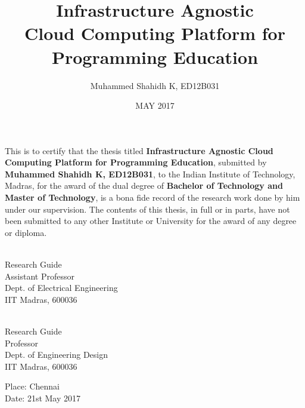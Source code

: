\documentclass[DD]{iitmdiss}
\begin{document}

\title{Infrastructure Agnostic\\
	 Cloud Computing Platform for Programming Education}

\author{Muhammed Shahidh K, ED12B031}

\date{MAY 2017}

\maketitle

\certificate

\vspace*{0.5in}

\noindent This is to certify that the thesis titled {\bf Infrastructure Agnostic Cloud Computing Platform for Programming Education}, submitted by {\bf Muhammed Shahidh K, ED12B031}, 
  to the Indian Institute of Technology, Madras, for
the award of the dual degree of {\bf Bachelor of Technology and Master of Technology}, is a bona fide
record of the research work done by him under our supervision.  The
contents of this thesis, in full or in parts, have not been submitted
to any other Institute or University for the award of any degree or
diploma.

\vspace*{1.5in}

\begin{singlespacing}
\hspace*{-0.25in}
\parbox{2.5in}{
 \\
\noindent Research Guide \\ 
\noindent Assistant Professor \\
\noindent Dept. of Electrical Engineering\\
\noindent IIT Madras, 600036 \\
} 
\hspace*{1.0in} 
\parbox{2.5in}{
 \\
\noindent Research Guide \\ 
\noindent Professor \\
\noindent Dept. of Engineering Design\\
\noindent IIT Madras, 600036 \\
}  
\end{singlespacing}
\vspace*{0.25in}
\noindent Place: Chennai\\
Date: 21st May 2017 
\end{document}
